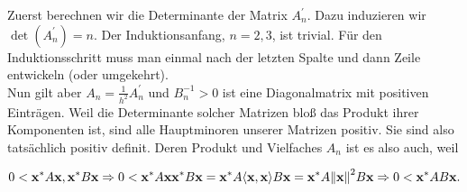 Zuerst berechnen wir die Determinante der Matrix $A_n^\prime$. Dazu induzieren wir $\det(A_n^\prime) = n$. Der Induktionsanfang, $n = 2, 3$, ist trivial. Für den Induktionsschritt muss man einmal nach der letzten Spalte und dann Zeile entwickeln (oder umgekehrt). \\

Nun gilt aber $A_n = \frac{1}{h^2} A_n^\prime$ und $B_n^{-1} > 0$ ist eine Diagonalmatrix mit positiven Einträgen. Weil die Determinante solcher Matrizen bloß das Produkt ihrer Komponenten ist, sind alle Hauptminoren unserer Matrizen positiv. Sie sind also tatsächlich positiv definit. Deren Produkt und Vielfaches $A_n$ ist es also auch, weil

\begin{align*}
  0 < \mathbf{x}^\ast A \mathbf{x}, \mathbf{x}^\ast B \mathbf{x}
  \Rightarrow
  0 < \mathbf{x}^\ast A \mathbf{x} \mathbf{x}^\ast B \mathbf{x} =
  \mathbf{x}^\ast A {\left < \mathbf{x}, \mathbf{x} \right >} B \mathbf{x} =
  \mathbf{x}^\ast A {\left \| \mathbf{x} \right \|}_{}^2 B \mathbf{x}
  \Rightarrow
  0 < \mathbf{x}^\ast AB \mathbf{x}.
\end{align*}
